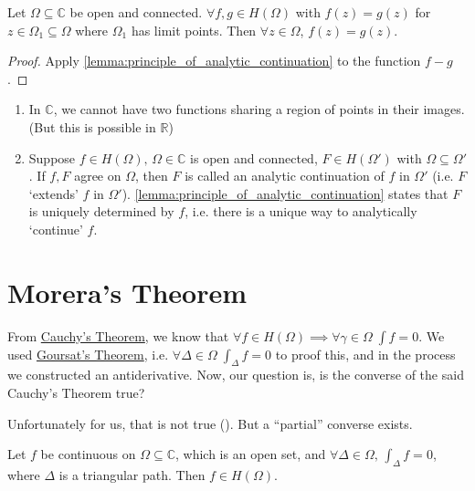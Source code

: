 \documentclass[notoc,notitlepage]{tufte-book}
\begin{document}
\begin{crly}\label{crly:uniqueness_of_a_function}
	Let $\Omega \subseteq \mathbb{C}$ be open and connected. $\forall f, g \in H(\Omega)$ with $f(z) = g(z)$ for $z \in \Omega_1 \subseteq \Omega$ where $\Omega_1$ has limit points. Then $\forall z \in \Omega$, $f(z) = g(z)$.
\end{crly}

\begin{proof}
	Apply \cref{lemma:principle_of_analytic_continuation} to the function $f - g$.
\end{proof}

\begin{remark}
	\begin{enumerate}
		\item In $\mathbb{C}$, we cannot have two functions sharing a region of points in their images. (But this is possible in $\mathbb{R}$)
		\item Suppose $f \in H(\Omega), \, \Omega \in \mathbb{C}$ is open and connected, $F \in H(\Omega')$ with $\Omega \subseteq \Omega'$. If $f, F$ agree on $\Omega$, then $F$ is called an analytic continuation of $f$ in $\Omega'$ (i.e. $F$ `extends' $f$ in $\Omega'$). \cref{lemma:principle_of_analytic_continuation} states that $F$ is uniquely determined by $f$, i.e. there is a unique way to analytically `continue' $f$.
	\end{enumerate}
\end{remark}


\section{Morera's Theorem} %
\label{sec:morera_s_theorem}

\begin{remark}[Recall]
	From \hyperref[thm:cauchy_s_theorem_for_convex_set]{Cauchy's Theorem}, we know that $\forall f \in H(\Omega) \implies \forall \gamma \in \Omega \; \int f = 0$. We used \hyperref[thm:goursat_s_theorem]{Goursat's Theorem}, i.e. $\forall \Delta \in \Omega \; \int_{\Delta} f = 0$ to proof this, and in the process we constructed an antiderivative. Now, our question is, is the converse of the said Cauchy's Theorem true?
\end{remark}
Unfortunately for us, that is not true (). But a ``partial'' converse exists.

\begin{thm}\label{thm:morera_s_theorem}
	Let $f$ be continuous on $\Omega \subseteq \mathbb{C}$, which is an open set, and $\forall \Delta \in \Omega, \, \int_{\Delta} f = 0$, where $\Delta$ is a triangular path. Then $f \in H(\Omega)$.
\end{thm}
\end{document}
